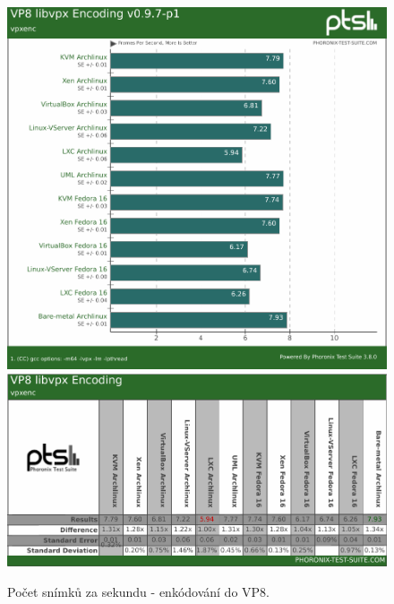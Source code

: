\begin{figure}[h!]
  \centering
  \includegraphics[width=15cm]{obr/bench/vpxenc-graph}
  \includegraphics[width=15cm]{obr/bench/vpxenc-table}
  \caption{Počet snímků za sekundu - enkódování do VP8.}
  \label{obr:bench:vpxenc}
\end{figure}



